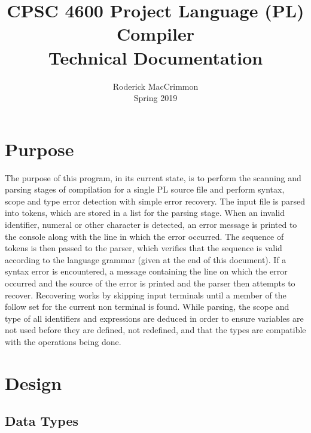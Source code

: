 \documentclass{article}
\begin{document}
\title{CPSC 4600 Project Language (PL) Compiler \\ \LARGE Technical Documentation}
\author{Roderick MacCrimmon \\ Spring 2019}
\date{}
\maketitle

\section{Purpose}

The purpose of this program, in its current state, is to perform the scanning and parsing stages of compilation for a single PL source file and perform syntax, scope and type error detection with simple error recovery. The input file is parsed into tokens, which are stored in a list for the parsing stage. When an invalid identifier, numeral or other character is detected, an error message is printed to the console along with the line in which the error occurred. The sequence of tokens is then passed to the parser, which verifies that the sequence is valid according to the language grammar (given at the end of this document). If a syntax error is encountered, a message containing the line on which the error occurred and the source of the error is printed and the parser then attempts to recover. Recovering works by skipping input terminals until a member of the follow set for the current non terminal is found. While parsing, the scope and type of all identifiers and expressions are deduced in order to ensure variables are not used before they are defined, not redefined, and that the types are compatible with the operations being done.

\section{Design}

\subsection*{Data Types}
\end{document}
